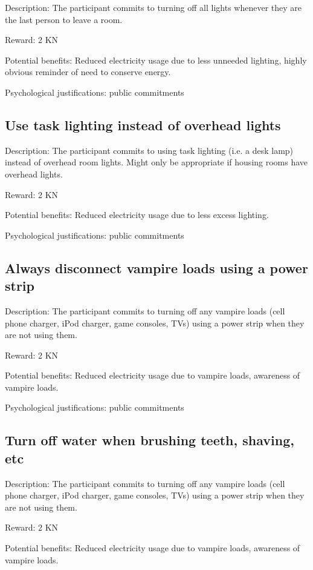 Description: The participant commits to turning off all lights whenever they are the last person to leave a room.

Reward: 2 KN

Potential benefits: Reduced electricity usage due to less unneeded lighting, highly obvious reminder of need to conserve energy.

Psychological justifications: public commitments

\subsection{Use task lighting instead of overhead lights}

Description: The participant commits to using task lighting (i.e. a desk lamp) instead of overhead room lights. Might only be appropriate if housing rooms have overhead lights.

Reward: 2 KN

Potential benefits: Reduced electricity usage due to less excess lighting.

Psychological justifications: public commitments

\subsection{Always disconnect vampire loads using a power strip}

Description: The participant commits to turning off any vampire loads (cell phone charger, iPod charger, game consoles, TVs) using a power strip when they are not using them.

Reward: 2 KN

Potential benefits: Reduced electricity usage due to vampire loads, awareness of vampire loads.

Psychological justifications: public commitments

\subsection{Turn off water when brushing teeth, shaving, etc}

Description: The participant commits to turning off any vampire loads (cell phone charger, iPod charger, game consoles, TVs) using a power strip when they are not using them.

Reward: 2 KN

Potential benefits: Reduced electricity usage due to vampire loads, awareness of vampire loads.

